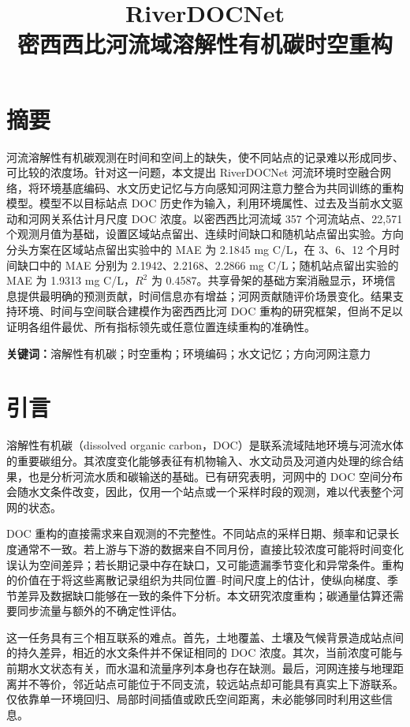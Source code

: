 \documentclass[UTF8,11pt,a4paper,fontset=none]{ctexart}
\title{\bfseries RiverDOCNet\\[.35em]密西西比河流域溶解性有机碳时空重构}
\author{}
\date{}
\begin{document}
\maketitle
\thispagestyle{plain}
\vspace{-2.4em}


\section*{摘要}

河流溶解性有机碳观测在时间和空间上的缺失，使不同站点的记录难以形成同步、可比较的浓度场。针对这一问题，本文提出 RiverDOCNet 河流环境时空融合网络，将环境基底编码、水文历史记忆与方向感知河网注意力整合为共同训练的重构模型。模型不以目标站点 DOC 历史作为输入，利用环境属性、过去及当前水文驱动和河网关系估计月尺度 DOC 浓度。以密西西比河流域 357 个河流站点、22,571 个观测月值为基础，设置区域站点留出、连续时间缺口和随机站点留出实验。方向分头方案在区域站点留出实验中的 MAE 为 2.1845 mg C/L，在 3、6、12 个月时间缺口中的 MAE 分别为 2.1942、2.2168、2.2866 mg C/L；随机站点留出实验的 MAE 为 1.9313 mg C/L，$R^2$ 为 0.4587。共享骨架的基础方案消融显示，环境信息提供最明确的预测贡献，时间信息亦有增益；河网贡献随评价场景变化。结果支持环境、时间与空间联合建模作为密西西比河 DOC 重构的研究框架，但尚不足以证明各组件最优、所有指标领先或任意位置连续重构的准确性。


\noindent\textbf{关键词：}溶解性有机碳；时空重构；环境编码；水文记忆；方向河网注意力


\section{引言}

溶解性有机碳（dissolved organic carbon，DOC）是联系流域陆地环境与河流水体的重要碳组分。其浓度变化能够表征有机物输入、水文动员及河道内处理的综合结果，也是分析河流水质和碳输送的基础。已有研究表明，河网中的 DOC 空间分布会随水文条件改变，因此，仅用一个站点或一个采样时段的观测，难以代表整个河网的状态\cite{casas2020}。


DOC 重构的直接需求来自观测的不完整性。不同站点的采样日期、频率和记录长度通常不一致\cite{sterle2024}。若上游与下游的数据来自不同月份，直接比较浓度可能将时间变化误认为空间差异；若长期记录中存在缺口，又可能遗漏季节变化和异常条件。重构的价值在于将这些离散记录组织为共同位置--时间尺度上的估计，使纵向梯度、季节差异及数据缺口能够在一致的条件下分析。本文研究浓度重构；碳通量估算还需要同步流量与额外的不确定性评估。


这一任务具有三个相互联系的难点。首先，土地覆盖、土壤及气候背景造成站点间的持久差异，相近的水文条件并不保证相同的 DOC 浓度。其次，当前浓度可能与前期水文状态有关，而水温和流量序列本身也存在缺测。最后，河网连接与地理距离并不等价，邻近站点可能位于不同支流，较远站点却可能具有真实上下游联系。仅依靠单一环境回归、局部时间插值或欧氏空间距离，未必能够同时利用这些信息。
\end{document}
